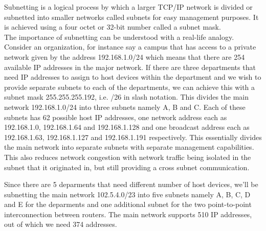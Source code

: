 \documentclass{home_assignment}
\begin{document}
Subnetting is a logical process by which a larger TCP/IP network is divided or subnetted into smaller networks called subnets for easy management purposes. It is achieved using a four octet or 32-bit number called a subnet mask.\\
The importance of subnetting can be understood with a real-life analogy. Consider an organization, for instance say a campus that has access to a private network given by the address 192.168.1.0/24 which means that there are 254 available IP addresses in the major network. If there are three departments that need IP addresses to assign to host devices within the department and we wish to provide separate subnets to each of the departments, we can achieve this with a subnet mask 255.255.255.192, i.e. /26 in slash notation. This divides the main network 192.168.1.0/24 into three subnets namely A, B and C. Each of these subnets has 62 possible host IP addresses, one network address each as 192.168.1.0, 192.168.1.64 and 192.168.1.128 and one broadcast address each as 192.168.1.63, 192.168.1.127 and 192.168.1.191 respectively. This essentially divides the main network into separate subnets with separate management capabilities. This also reduces network congestion with network traffic being isolated in the subnet that it originated in, but still providing a cross subnet communication.

Since there are 5 deparments that need different number of host devices, we'll be subnetting the main network 102.5.4.0/23 into five subnets namely A, B, C, D and E for the deparments and one additional subnet for the two point-to-point interconnection between routers. The main network supports 510 IP addresses, out of which we need 374 addresses. 
\end{document}
